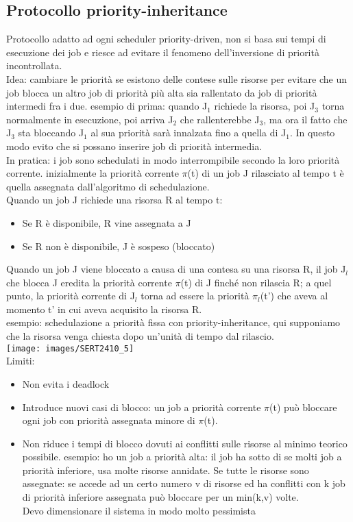 \documentclass[18px]{article}
\begin{document}
\subsection{Protocollo priority-inheritance}
Protocollo adatto ad ogni scheduler priority-driven, non si basa sui tempi di esecuzione dei job e riesce ad evitare il fenomeno dell'inversione di priorità incontrollata.\\ Idea: cambiare le priorità se esistono delle contese sulle risorse per evitare che un job blocca un altro job di priorità più alta sia rallentato da job di priorità intermedi fra i due. esempio di prima: quando J$_{1}$ richiede la risorsa, poi J$_{3}$ torna normalmente in esecuzione, poi arriva J$_{2}$ che rallenterebbe J$_{3}$, ma ora il fatto che J$_{3}$ sta bloccando J$_{1}$ al sua priorità sarà innalzata fino a quella di J$_{1}$. In questo modo evito che si possano inserire job di priorità intermedia.\\ In pratica: i job sono schedulati in modo interrompibile secondo la loro priorità corrente. inizialmente la priorità corrente $\pi$(t) di un job J rilasciato al tempo t è quella assegnata dall'algoritmo di schedulazione.\\ Quando un job J richiede una risorsa R al tempo t:
\begin{itemize}
\item Se R è disponibile, R vine assegnata a J
\item Se R non è disponibile, J è sospeso (bloccato)
\end{itemize}
Quando un job J viene bloccato a causa di una contesa su una risorsa R, il job J$_{l}$ che blocca J eredita la priorità corrente $\pi$(t)  di J finché non rilascia R; a quel punto, la priorità corrente di J$_{l}$ torna ad essere la priorità $\pi_{l}$(t') che aveva al momento t' in cui aveva acquisito la risorsa R.\\ esempio: schedulazione a priorità fissa con priority-inheritance, qui supponiamo che la risorsa venga chiesta dopo un'unità di tempo dal rilascio.\\
\texttt{[image: images/SERT2410\_5]}\\
Limiti:
\begin{itemize}
\item Non evita i deadlock
\item Introduce nuovi casi di blocco: un job a priorità corrente $\pi$(t) può bloccare ogni job con priorità assegnata minore di $\pi$(t).
\item Non riduce i tempi di blocco dovuti ai conflitti sulle risorse al minimo teorico possibile. esempio: ho un job a priorità alta: il job ha sotto di se molti job a priorità inferiore, usa molte risorse annidate. Se tutte le risorse sono assegnate: se accede ad un certo numero v di risorse ed ha conflitti con k job di priorità inferiore assegnata può bloccare per un min(k,v) volte.\\ Devo dimensionare il sistema in modo molto pessimista
\end{itemize}
\end{document}

